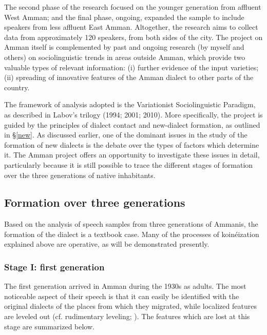 \documentclass[output=paper]{langsci/langscibook}
\begin{document}
The second phase of the research focused on the younger generation from affluent West Amman; and the final phase, ongoing, expanded the sample to include speakers from less affluent East Amman. Altogether, the research aims to collect data from approximately 120 speakers, from both sides of the city. The project on Amman itself is complemented by past and ongoing research (by myself and others) on sociolinguistic trends in areas outside Amman, which provide two valuable types of relevant information: (i) further evidence of the input varieties; (ii) spreading of innovative features of the Amman dialect to other parts of the country.

The framework of analysis adopted is the Variationist Sociolinguistic Paradigm, as described in Labov’s trilogy (1994; 2001; 2010). More specifically, the project is guided by the principles of dialect contact and new-dialect formation, as outlined in §\ref{new}. As discussed earlier, one of the dominant issues in the study of the formation of new dialects is the debate over the types of factors which determine it. The Amman project offers an opportunity to investigate these issues in detail, particularly because it is still possible to trace the different stages of formation over the three generations of native inhabitants.

\subsection{Formation over three generations} \label{three}

Based on the analysis of speech samples from three generations of Ammanis, the formation of the dialect is a textbook case. Many of the processes of koinéization explained above are operative, as will be demonstrated presently.

\subsubsection{Stage I: first generation}

The first generation arrived in Amman during the 1930s as adults. The most noticeable aspect of their speech is that it can easily be identified with the original dialects of the places from which they migrated, while localized features are leveled out (cf. rudimentary leveling; \citealt{Trudgill2004}). The features which are lost at this stage are summarized below.
\end{document}
